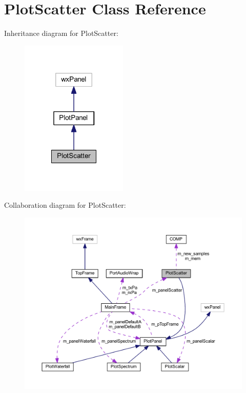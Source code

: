 \hypertarget{class_plot_scatter}{\section{Plot\-Scatter Class Reference}
\label{class_plot_scatter}
}


Inheritance diagram for Plot\-Scatter\-:
\nopagebreak
\begin{figure}[H]
\begin{center}
\leavevmode
\includegraphics[width=144pt]{class_plot_scatter__inherit__graph}
\end{center}
\end{figure}


Collaboration diagram for Plot\-Scatter\-:
\nopagebreak
\begin{figure}[H]
\begin{center}
\leavevmode
\includegraphics[width=350pt]{class_plot_scatter__coll__graph}
\end{center}
\end{figure}
